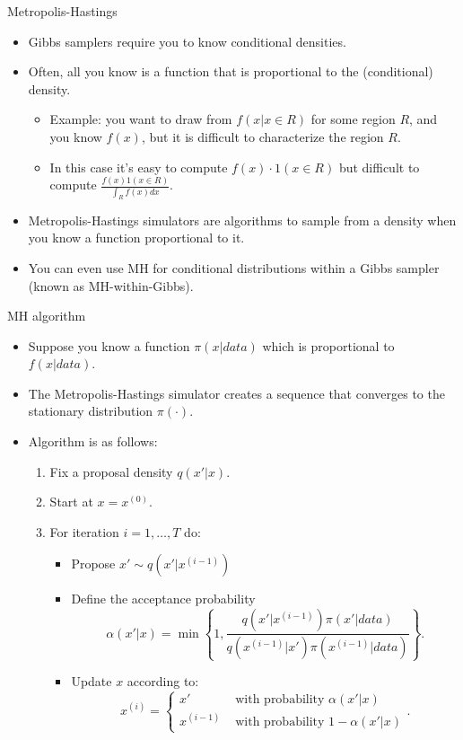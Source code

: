\documentclass[aspectratio=169]{beamer}
\begin{document}
%
\begin{frame}{Metropolis-Hastings}
\begin{itemize}
\item Gibbs samplers require you to know conditional densities.
\item Often, all you know is a function that is proportional to the (conditional)
density.
\begin{itemize}
\item Example: you want to draw from $f(x|x\in R)$ for some region $R$,
and you know $f(x)$, but it is difficult to characterize the region
$R.$
\item In this case it's easy to compute $f(x)\cdot1(x\in R)$ but difficult
to compute $\frac{f(x)1(x\in R)}{\int_{R}f(x)dx}.$ 
\end{itemize}
\item Metropolis-Hastings simulators are algorithms to sample from a density
when you know a function proportional to it.
\item You can even use MH for conditional distributions within a Gibbs sampler
(known as MH-within-Gibbs).
\end{itemize}
\end{frame}
%
\begin{frame}{MH algorithm}
\begin{itemize}
\item Suppose you know a function $\pi(x|data)$ which is proportional to $f(x|data).$
\item The Metropolis-Hastings simulator creates a sequence that converges
to the stationary distribution $\pi(\cdot).$
\item Algorithm is as follows:
\begin{enumerate}
\item Fix a proposal density $q(x'|x).$ 
\item Start at $x=x^{(0)}.$ 
\item For iteration $i=1,\ldots,T$ do:
\begin{itemize}
\item Propose $x'\sim q(x'|x^{(i-1)})$
\item Define the acceptance probability 
\[
\alpha(x'|x)=\min\left\{ 1,\frac{q(x'|x^{(i-1)})\pi(x'|data)}{q(x^{(i-1)}|x')\pi(x^{(i-1)}|data)}\right\} .
\]
\item Update $x$ according to: 
\[
x^{(i)}=\begin{cases}
x' & \text{ with probability }\alpha(x'|x)\\
x^{(i-1)} & \text{ with probability }1-\alpha(x'|x)
\end{cases}.
\]
\end{itemize}
\end{enumerate}
\end{itemize}
\end{frame}
\end{document}
